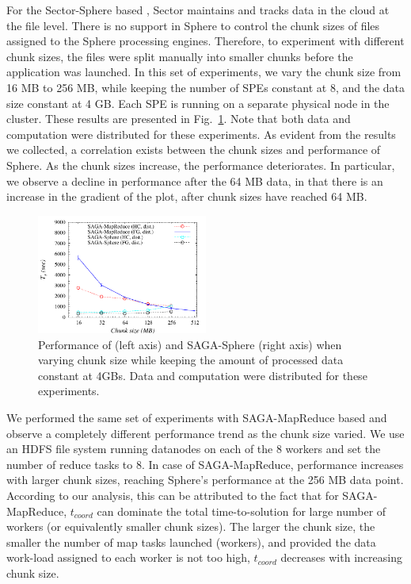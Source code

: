 \documentclass[3p,twocolumn]{elsarticle}
\begin{document}
For the Sector-Sphere based \wc, Sector maintains and tracks data in
the cloud at the file level. There is no support in Sphere to control
the chunk sizes of files assigned to the Sphere processing
engines. Therefore, to experiment with different chunk sizes, the
files were split manually into smaller chunks before the \wc
application was launched. In this set of experiments, we vary the
chunk size from 16 MB to 256 MB, while keeping the number of SPEs
constant at 8, and the data size constant at 4 GB. Each SPE is running
on a separate physical node in the cluster. These results are
presented in Fig.~\ref{fig:sphere_mr_chunksize}.  Note that both data
and computation were distributed for these experiments.  As evident
from the results we collected, a correlation exists between the chunk
sizes and performance of Sphere.  As the chunk sizes increase, the
performance deteriorates. In particular, we observe a decline in
performance after the 64 MB data, in that there is an increase in the
gradient of the plot, after chunk sizes have reached 64 MB.


\begin{figure}[htb!]
 \dnnn\dnnn
 \includegraphics[width=0.5\textwidth]{figures/sphere_mr_varying_chunksize.pdf}
 \caption{
   Performance of \sagamapreduce (left axis) and
   SAGA-Sphere (right axis) when varying chunk size while keeping the amount
   of processed data constant at 4GBs. Data and computation were
   distributed for these experiments.
   \label{fig:sphere_mr_chunksize}
   }
\end{figure}

We performed the same set of experiments with SAGA-MapReduce based \wc
and observe a completely different performance trend as the chunk size
varied.  We use an HDFS file system running datanodes on each of the 8
workers and set the number of reduce tasks to 8.  In case of
SAGA-MapReduce, performance increases with larger chunk sizes,
reaching Sphere's performance at the 256 MB data point.  According to
our analysis, this can be attributed to the fact that for
SAGA-MapReduce, $t_{coord}$ can dominate the total time-to-solution
for large number of workers (or equivalently smaller chunk sizes).
The larger the chunk size, the smaller the number of map tasks
launched (workers), and provided the data work-load assigned to each
worker is not too high, $t_{coord}$ decreases with increasing chunk
size.
\end{document}
